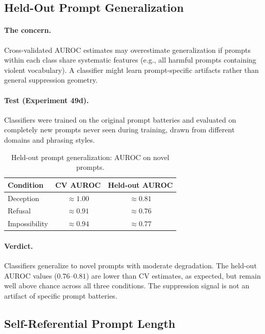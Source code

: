 \subsection{Held-Out Prompt Generalization}
\label{sec:heldout}

\paragraph{The concern.} Cross-validated AUROC estimates may overestimate generalization if prompts within each class share systematic features (e.g., all harmful prompts containing violent vocabulary). A classifier might learn prompt-specific artifacts rather than general suppression geometry.

\paragraph{Test (Experiment 49d).} Classifiers were trained on the original prompt batteries and evaluated on completely new prompts never seen during training, drawn from different domains and phrasing styles.

\begin{table}[H]
\centering
\caption{Held-out prompt generalization: AUROC on novel prompts.}
\label{tab:heldout}
\begin{tabular}{lcc}
\toprule
\textbf{Condition} & \textbf{CV AUROC} & \textbf{Held-out AUROC} \\
\midrule
Deception & $\approx 1.00$ & $\approx 0.81$ \\
Refusal & $\approx 0.91$ & $\approx 0.76$ \\
Impossibility & $\approx 0.94$ & $\approx 0.77$ \\
\bottomrule
\end{tabular}
\end{table}

\paragraph{Verdict.} Classifiers generalize to novel prompts with moderate degradation. The held-out AUROC values ($0.76$--$0.81$) are lower than CV estimates, as expected, but remain well above chance across all three conditions. The suppression signal is not an artifact of specific prompt batteries.

\subsection{Self-Referential Prompt Length}
\label{sec:lyra_length}

